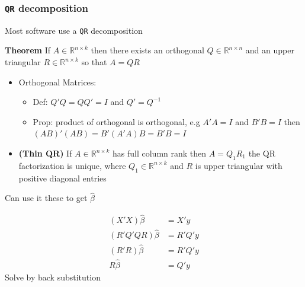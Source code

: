\documentclass[
  shownotes,
  xcolor={svgnames},
  hyperref={colorlinks,citecolor=DarkBlue,linkcolor=DarkRed,urlcolor=DarkBlue}
  , aspectratio=169]{beamer}
\newenvironment{Shaded}{\begin{snugshade}}{\end{snugshade}}
\begin{document}
\begin{frame}[fragile]
\frametitle{\texttt{QR} decomposition}
Most software use a \texttt{QR} decomposition
 
 \begin{Shaded}
{\bf Theorem}
If $A\in\mathbb{R}^{n\times k}$ then there exists an orthogonal $Q\in \mathbb{R}^{n\times n}$ and an upper triangular $R\in \mathbb{R}^{n\times k}$ so that $A=QR$
\end{Shaded}

\begin{itemize}
  
  \footnotesize
  \item Orthogonal Matrices: 
  \begin{itemize}
    \tiny
  \item Def: $Q'Q=QQ'=I$ and $Q'=Q^{-1}$
  \item Prop: product of orthogonal is orthogonal, e.g $A'A=I$ and $B'B=I$ then $(AB)'(AB)=B'(A'A)B=B'B=I$
  \end{itemize}
  \item {\bf (Thin QR)} If $A\in\mathbb{R}^{n\times k}$   has full column rank then $A=Q_1R_1$ the QR factorization is unique, where $Q_1 \in\mathbb{R}^{n\times k}$ and $R$ is upper triangular with  positive diagonal entries
\end{itemize}

Can use it these to get $\hat \beta$

\footnotesize
\begin{align}
  (X'X) \hat \beta &=  X'y  \\
  (R'Q'QR) \hat \beta &=  R'Q'y  \\
  (R'R) \hat \beta &=  R'Q'y  \\
  R \hat \beta &=  Q'y  
\end{align}
Solve by back substitution

\end{frame}
\end{document}

